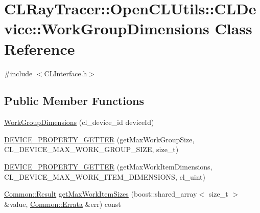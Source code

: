 \hypertarget{class_c_l_ray_tracer_1_1_open_c_l_utils_1_1_c_l_device_1_1_work_group_dimensions}{}\section{C\+L\+Ray\+Tracer\+:\+:Open\+C\+L\+Utils\+:\+:C\+L\+Device\+:\+:Work\+Group\+Dimensions Class Reference}
\label{class_c_l_ray_tracer_1_1_open_c_l_utils_1_1_c_l_device_1_1_work_group_dimensions}


{\ttfamily \#include $<$C\+L\+Interface.\+h$>$}

\subsection*{Public Member Functions}
\begin{DoxyCompactItemize}
\item 
\hyperlink{class_c_l_ray_tracer_1_1_open_c_l_utils_1_1_c_l_device_1_1_work_group_dimensions_ae5cf1324551c302c61241ee3f4546fd8}{Work\+Group\+Dimensions} (cl\+\_\+device\+\_\+id device\+Id)
\item 
\hyperlink{class_c_l_ray_tracer_1_1_open_c_l_utils_1_1_c_l_device_1_1_work_group_dimensions_ac609b4c595f2eafaa7426b0af8fa75a7}{D\+E\+V\+I\+C\+E\+\_\+\+P\+R\+O\+P\+E\+R\+T\+Y\+\_\+\+G\+E\+T\+T\+ER} (get\+Max\+Work\+Group\+Size, C\+L\+\_\+\+D\+E\+V\+I\+C\+E\+\_\+\+M\+A\+X\+\_\+\+W\+O\+R\+K\+\_\+\+G\+R\+O\+U\+P\+\_\+\+S\+I\+ZE, size\+\_\+t)
\item 
\hyperlink{class_c_l_ray_tracer_1_1_open_c_l_utils_1_1_c_l_device_1_1_work_group_dimensions_a22779ba8b6eb8f80a61a1500c89b3fc2}{D\+E\+V\+I\+C\+E\+\_\+\+P\+R\+O\+P\+E\+R\+T\+Y\+\_\+\+G\+E\+T\+T\+ER} (get\+Max\+Work\+Item\+Dimensions, C\+L\+\_\+\+D\+E\+V\+I\+C\+E\+\_\+\+M\+A\+X\+\_\+\+W\+O\+R\+K\+\_\+\+I\+T\+E\+M\+\_\+\+D\+I\+M\+E\+N\+S\+I\+O\+NS, cl\+\_\+uint)
\item 
\hyperlink{_errata_8h_a389396702f1aff6e71eb21328b0775c1}{Common\+::\+Result} \hyperlink{class_c_l_ray_tracer_1_1_open_c_l_utils_1_1_c_l_device_1_1_work_group_dimensions_ae54257325fdf3e13bac148d01ba5e0bb}{get\+Max\+Work\+Item\+Sizes} (boost\+::shared\+\_\+array$<$ size\+\_\+t $>$ \&value, \hyperlink{class_c_l_ray_tracer_1_1_common_1_1_errata}{Common\+::\+Errata} \&err) const 
\end{DoxyCompactItemize}


